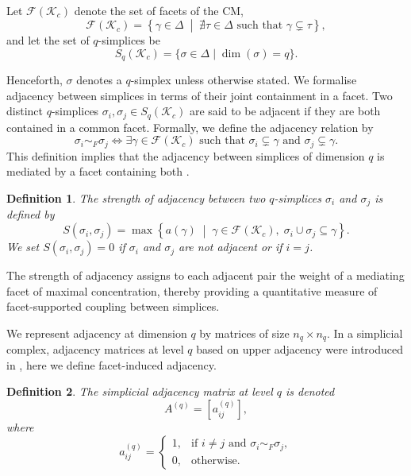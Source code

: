 \documentclass[12pt]{article}
\theoremstyle{normalhead_nobrackets}
\newtheorem{definition}{Definition}[section]
\theoremstyle{exampstyle}
\begin{document}
Let $\mathcal{F}(\mathcal{K}_c)$ denote the set of facets of the CM,
\[
\mathcal{F}(\mathcal{K}_c) =
\left\{
\gamma \in \Delta \;\middle|\; \nexists \tau \in \Delta  \text{ such that } \gamma \subsetneq \tau
\right\},
\]
and let the set of $q$-simplices be
\[
S_q(\mathcal{K}_c) = \{ \sigma \in \Delta \mid \dim(\sigma) = q \}.
\]

Henceforth, $\sigma$ denotes a $q$-simplex unless otherwise stated. We formalise adjacency between simplices in terms of their joint containment in a facet. Two distinct $q$-simplices $\sigma_i, \sigma_j \in S_q(\mathcal{K}_c)$ are said to be adjacent if they are both contained in a common facet. Formally, we define the adjacency relation by
\[
\sigma_i \sim_F \sigma_j
\iff
\exists \gamma \in \mathcal{F}(\mathcal{K}_c)
\text{ such that }
\sigma_i \subsetneq \gamma
\text{ and }
\sigma_j \subsetneq \gamma.
\]
This definition implies that the adjacency between simplices of dimension $q$ is mediated by a facet containing both \cite{raj2025study}.

\begin{definition}
The {strength of adjacency} between two $q$-simplices $\sigma_i$ and $\sigma_j$ is defined by
\[
S(\sigma_i, \sigma_j)
=
\max \left\{
a(\gamma)
\;\middle|\;
\gamma \in \mathcal{F}(\mathcal{K}_c),\;
\sigma_i \cup \sigma_j \subseteq \gamma
\right\}.
\]
We set $S(\sigma_i, \sigma_j) = 0$ if $\sigma_i$ and $\sigma_j$ are not adjacent or if $i = j$.
\end{definition}

The strength of adjacency assigns to each adjacent pair the weight of a mediating facet of maximal concentration, thereby providing a quantitative measure of facet-supported coupling between simplices.

We represent adjacency at dimension $q$ by matrices of size $n_q \times n_q$. In a simplicial complex, adjacency matrices at level $q$ based on upper adjacency were introduced in \cite{estrada2018}, here we define facet-induced adjacency.

\begin{definition}
The {simplicial adjacency matrix} at level $q$ is denoted
\[
A^{(q)} = [a_{ij}^{(q)}],
\]
where
\[
a_{ij}^{(q)} =
\begin{cases}
1, & \text{if } i \neq j \text{ and } \sigma_i \sim_F \sigma_j, \\
0, & \text{otherwise}.
\end{cases}
\]
\end{definition}
\end{document}
